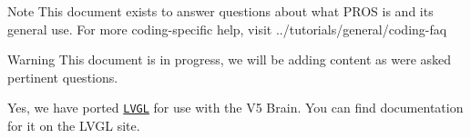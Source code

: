 \begin{DoxyNote}{Note}
This document exists to answer questions about what P\+R\+OS is and its general use. For more coding-\/specific help, visit ../tutorials/general/coding-\/faq
\end{DoxyNote}
\begin{DoxyWarning}{Warning}
This document is in progress, we will be adding content as we\textquotesingle{}re asked pertinent questions.
\end{DoxyWarning}


Yes, we have ported \href{https://littlevgl.com/}{\tt L\+V\+GL} for use with the V5 Brain. You can find documentation for it on the L\+V\+GL site. 
